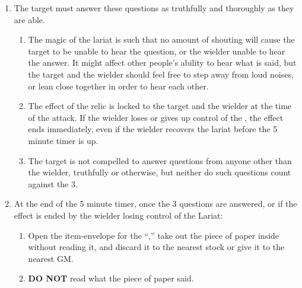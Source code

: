 \documentclass[green]{GL2020}
\begin{document}
\begin{enumerate}
\begin{enumerate}
  \end{enumerate}
  \item The target must answer these questions as truthfully and thoroughly as they are able.
    \begin{enumerate}
    \item The magic of the lariat is such that no amount of shouting will cause the target to be unable to hear the question, or the wielder unable to hear the answer. It might affect other people’s ability to hear what is said, but the target and the wielder should feel free to step away from loud noises, or lean close together in order to hear each other.
    \item The effect of the relic is locked to the target and the wielder at the time of the attack. If the wielder loses or gives up control of the \iLariat{}, the effect ends immediately, even if the wielder recovers the lariat before the 5 minute timer is up.
    \item The target is not compelled to answer questions from anyone other than the wielder, truthfully or otherwise, but neither do such questions count against the 3.
  \end{enumerate}
  \item At the end of the 5 minute timer, once the 3 questions are answered, or if the effect is ended by the wielder losing control of the Lariat:
  \begin{enumerate}
    \item Open the item-envelope for the ``\iPitcher{},'' take out the piece of paper inside without reading it, and discard it to the nearest stock or give it to the nearest GM.
    \item \textbf{DO NOT} read what the piece of paper said.
  \end{enumerate}
\end{enumerate}
\end{document}

